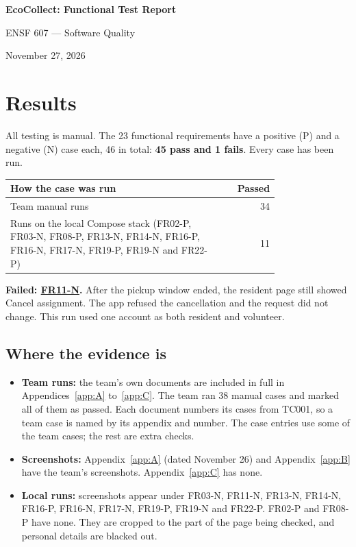 \documentclass[11pt]{article}
\begin{document}
\begin{center}
  {\LARGE\bfseries EcoCollect: Functional Test Report}\par
  {\large ENSF 607 --- Software Quality}\par
  November 27, 2026
\end{center}

\tableofcontents

\section{Results}

All testing is manual. The 23 functional requirements have a positive (P) and a negative (N) case each, 46 in total: \textbf{45 pass and 1 fails}. Every case has been run.

\begin{center}
\begin{tabular}{p{0.78\linewidth}r}
\toprule
How the case was run & Passed \\
\midrule
Team manual runs & 34 \\
Runs on the local Compose stack (FR02-P, FR03-N, FR08-P, FR13-N, FR14-N, FR16-P, FR16-N, FR17-N, FR19-P, FR19-N and FR22-P) & 11 \\
\bottomrule
\end{tabular}
\end{center}

\textbf{Failed: \hyperref[FR11-N]{FR11-N}.} After the pickup window ended, the resident page still showed Cancel assignment. The app refused the cancellation and the request did not change. This run used one account as both resident and volunteer.

\subsection*{Where the evidence is}
\begin{itemize}[itemsep=2pt]
  \item \textbf{Team runs:} the team's own documents are included in full in Appendices~\ref{app:A} to~\ref{app:C}. The team ran 38 manual cases and marked all of them as passed. Each document numbers its cases from TC001, so a team case is named by its appendix and number. The case entries use some of the team cases; the rest are extra checks.
  \item \textbf{Screenshots:} Appendix~\ref{app:A} (dated November 26) and Appendix~\ref{app:B} have the team's screenshots. Appendix~\ref{app:C} has none.
  \item \textbf{Local runs:} screenshots appear under FR03-N, FR11-N, FR13-N, FR14-N, FR16-P, FR16-N, FR17-N, FR19-P, FR19-N and FR22-P. FR02-P and FR08-P have none. They are cropped to the part of the page being checked, and personal details are blacked out.
\end{itemize}
\end{document}

